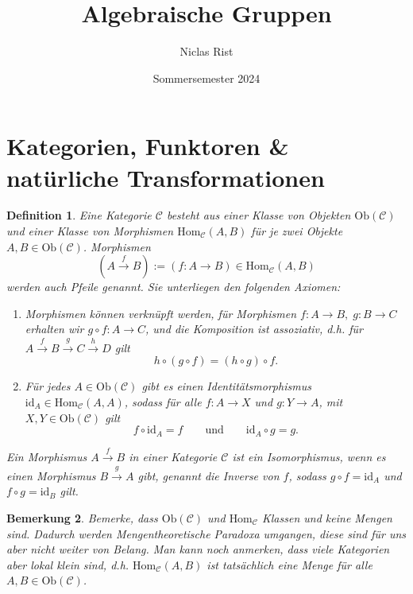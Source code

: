 \documentclass[a4paper, 11pt]{scrartcl}
\title{Algebraische Gruppen}
\author{Niclas Rist}
\date{Sommersemester 2024}
\newcommand{\Hom}{\text{Hom}}
\newcommand{\id}{\text{id}}
\newcommand{\Ob}{\text{Ob}}
\theoremstyle{basicstyle}
\newtheorem{definition}{Definition}[section]
\newtheorem{bemerkung}[definition]{Bemerkung}
\begin{document}
    \maketitle
    \onehalfspacing

    \section{Kategorien, Funktoren \& natürliche Transformationen}

    \begin{definition}
        Eine \emph{Kategorie} \(\mathcal{C}\) besteht aus einer Klasse von \emph{Objekten} \(\Ob(\mathcal{C})\) und einer Klasse von \emph{Morphismen} \(\Hom_{\mathcal{C}}(A, B)\) für je zwei Objekte \(A, B \in \Ob(\mathcal{C})\).
        Morphismen
        \[(A \overset{f}{\longrightarrow} B) := (f: A \longrightarrow B) \in \Hom_{\mathcal{C}}(A, B)\]
        werden auch \emph{Pfeile} genannt.
        Sie unterliegen den folgenden Axiomen:
        \begin{enumerate}
            \item Morphismen können \emph{verknüpft} werden, für Morphismen \(f: A \to B, \; g: B \to C\) erhalten wir \(g \circ f: A \to C\), und die Komposition ist assoziativ, d.h. für \(A \overset{f}{\longrightarrow} B \overset{g}{\longrightarrow} C \overset{h}{\longrightarrow} D\) gilt
                \[h \circ (g \circ f) = (h \circ g) \circ f.\]
            \item Für jedes \(A \in \Ob(\mathcal{C})\) gibt es einen \emph{Identitätsmorphismus} \(\id_A \in \Hom_{\mathcal{C}}(A, A)\), sodass für alle \(f: A \to X\) und \(g: Y \to A\), mit \(X, Y \in \Ob(\mathcal{C})\) gilt
                \[f \circ \id_A = f \qquad\text{und}\qquad \id_A \circ g = g.\]
        \end{enumerate}
        Ein Morphismus \(A \overset{f}{\longrightarrow} B\) in einer Kategorie \(\mathcal{C}\) ist ein \emph{Isomorphismus}, wenn es einen Morphismus \(B \overset{g}{\longrightarrow} A\) gibt, genannt die \emph{Inverse} von \(f\), sodass \(g \circ f = \id_A\) und \(f \circ g = \id_B\) gilt.
    \end{definition}

    \begin{bemerkung}
        Bemerke, dass \(\Ob(\mathcal{C})\) und \(\Hom_{\mathcal{C}}\) Klassen und keine Mengen sind.
        Dadurch werden Mengentheoretische Paradoxa umgangen, diese sind für uns aber nicht weiter von Belang.
        Man kann noch anmerken, dass viele Kategorien aber \emph{lokal klein} sind, d.h. \(\Hom_{\mathcal{C}}(A, B)\) ist tatsächlich eine Menge für alle \(A, B \in \Ob(\mathcal{C})\).
    \end{bemerkung}
\end{document}
